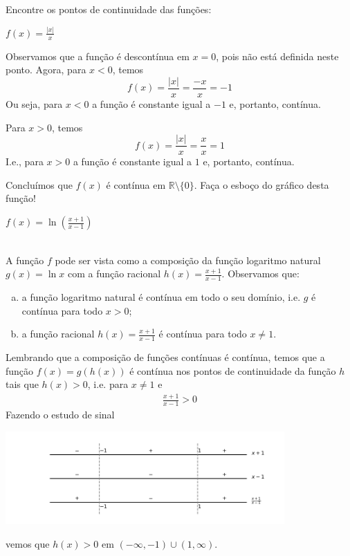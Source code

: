 \cleardoublepage\documentclass[../main.tex]{subfiles}
\begin{document}
\begin{exeresol}
  Encontre os pontos de continuidade das funções:
  \begin{compactenum}[a)]
  \item $  f(x) = \frac{|x|}{x}$\\
  \begin{resol}
     Observamos que a função é descontínua em $x=0$, pois não está definida neste ponto. Agora, para $x < 0$, temos
  \begin{equation*}
    f(x) = \frac{|x|}{x} = \frac{-x}{x} = -1
  \end{equation*}
  Ou seja, para $x<0$ a função é constante igual a $-1$ e, portanto, contínua.

  Para $x > 0$, temos
  \begin{equation*}
    f(x) = \frac{|x|}{x} = \frac{x}{x} = 1
  \end{equation*}
  I.e., para $x > 0$ a função é constante igual a $1$ e, portanto, contínua.

  Concluímos que $f(x)$ é contínua em $\mathbb{R}\setminus\{0\}$. \dica Faça o esboço do gráfico desta função!
  \end{resol}
  \item $f(x) = \ln\left(\frac{x+1}{x-1}\right)  $\\\\
  \begin{resol}
  A função $f$ pode ser vista como a composição da função logaritmo natural $g(x) = \ln x$ com a função racional $\displaystyle h(x) = \frac{x+1}{x-1}$. Observamos que:
  \begin{enumerate}[a)]
  \item a função logaritmo natural é contínua em todo o seu domínio, i.e. $g$ é contínua para todo $x > 0$;
  \item a função racional $\displaystyle h(x) = \frac{x+1}{x-1}$ é contínua para todo $x\neq 1$.
  \end{enumerate}
  Lembrando que a composição de funções contínuas é contínua, temos que a função $f(x) = g(h(x))$ é contínua nos pontos de continuidade da função $h$ tais que $h(x) > 0$, i.e. para $x\neq 1$ e
  \begin{align*}
    \frac{x+1}{x-1} > 0
  \end{align*}
  Fazendo o estudo de sinal
  \begin{center}
    \includegraphics[width=0.8\textwidth]{fig_lim/fig_cap_lim_exeresol_estsinal}
  \end{center}
  vemos que $h(x) > 0$ em $(-\infty, -1)\cup (1, \infty)$.


\end{resol}
\end{compactenum}
\end{exeresol}
\end{document}
